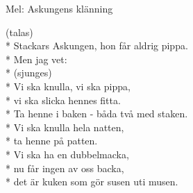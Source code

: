 \begin{SongText}
    \begin{SongInfo}
        Mel: Askungens klänning
    \end{SongInfo}
    \begin{SongVerse}
        (talas)\\*%
        Stackars Askungen, hon får aldrig pippa.\\*%
        Men jag vet:\\*%
        (sjunges)\\*%
        Vi ska knulla, vi ska pippa,\\*%
        vi ska slicka hennes fitta.\\*%
        Ta henne i baken - båda två med staken.\\*%
        Vi ska knulla hela natten,\\*%
        ta henne på patten.\\*%
        Vi ska ha en dubbelmacka,\\*%
        nu får ingen av oss backa,\\*%
        det är kuken som gör susen uti musen.
    \end{SongVerse}
\end{SongText}
